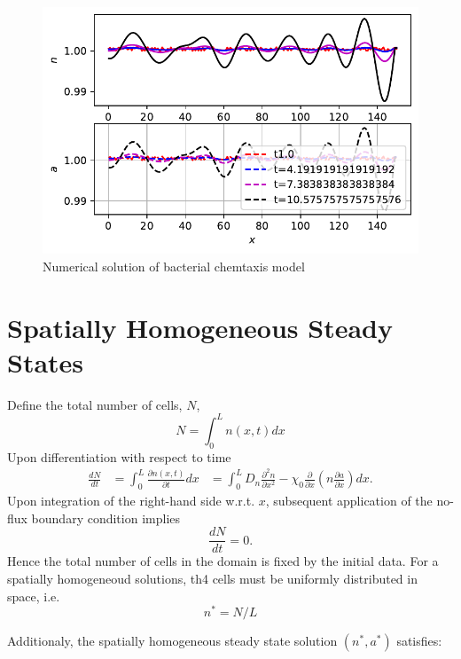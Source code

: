 \documentclass[
  letterpaper,
  DIV=11,
  numbers=noendperiod]{scrreprt}
\theoremstyle{plain}
\theoremstyle{definition}
\theoremstyle{plain}
\theoremstyle{remark}
\begin{document}
\begin{figure}

{\centering \includegraphics{BacterialChemotaxis_files/figure-pdf/fig-bacterialchemotaxispde-output-1.pdf}

}

\caption{\label{fig-bacterialchemotaxispde}Numerical solution of
bacterial chemtaxis model}

\end{figure}

\hypertarget{spatially-homogeneous-steady-states-1}{%
\section{Spatially Homogeneous Steady
States}\label{spatially-homogeneous-steady-states-1}}

Define the total number of cells, \(N\), \[
N= \int_0^L n(x,t)dx
\] Upon differentiation with respect to time \[
\begin{aligned}
\frac{dN}{dt} &=\int_0^L \frac{\partial n(x,t)}{\partial t}dx
&=\int_0^L  D_n \frac{\partial ^2 n}{\partial x^2} - \chi_0 \frac{\partial}{\partial x} \left( n \frac{\partial a}{\partial x} \right) dx.
\end{aligned}
\] Upon integration of the right-hand side w.r.t. \(x\), subsequent
application of the no-flux boundary condition implies \[
\frac{dN}{dt}=0.
\] Hence the total number of cells in the domain is fixed by the initial
data. For a spatially homogeneoud solutions, th4 cells must be uniformly
distributed in space, i.e. \[
n^*=N/L
\]

Additionaly, the spatially homogeneous steady state solution
\((n^* , a^* )\) satisfies:
\end{document}
